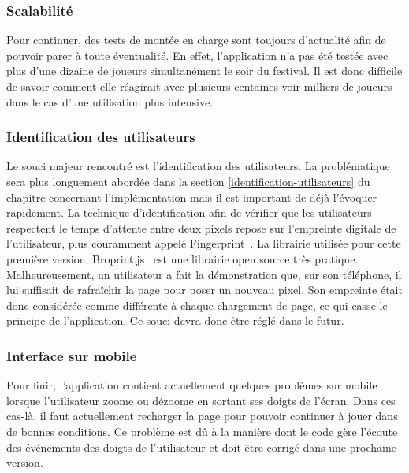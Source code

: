 \subsubsection{Scalabilité}
Pour continuer, des tests de montée en charge sont toujours d'actualité afin de pouvoir parer à toute éventualité. En effet, l'application n'a pas été testée avec plus d'une dizaine de joueurs simultanément le soir du festival. Il est donc difficile de savoir comment elle réagirait avec plusieurs centaines voir milliers de joueurs dans le cas d'une utilisation plus intensive.

\subsubsection{Identification des utilisateurs}
Le souci majeur rencontré est l'identification des utilisateurs. La problématique sera plus longuement abordée dans la section \ref{identification-utilisateurs} du chapitre concernant l'implémentation mais il est important de déjà l'évoquer rapidement. La technique d'identification afin de vérifier que les utilisateurs respectent le temps d'attente entre deux pixels repose sur l'empreinte digitale de l'utilisateur, plus couramment appelé Fingerprint~\cite{devicefingerprint}. La librairie utilisée pour cette première version, Broprint.js~\cite{broprintjs} est une librairie open source très pratique. Malheureusement, un utilisateur a fait la démonstration que, sur son téléphone, il lui suffisait de rafraîchir la page pour poser un nouveau pixel. Son empreinte était donc considérée comme différente à chaque chargement de page, ce qui casse le principe de l'application. Ce souci devra donc être réglé dans le futur.

\subsubsection{Interface sur mobile}
Pour finir, l'application contient actuellement quelques problèmes sur mobile lorsque l'utilisateur zoome ou dézoome en sortant ses doigts de l'écran. Dans ces cas-là, il faut actuellement recharger la page pour pouvoir continuer à jouer dans de bonnes conditions. Ce problème est dû à la manière dont le code gère l'écoute des événements des doigts de l'utilisateur et doit être corrigé dans une prochaine version.
